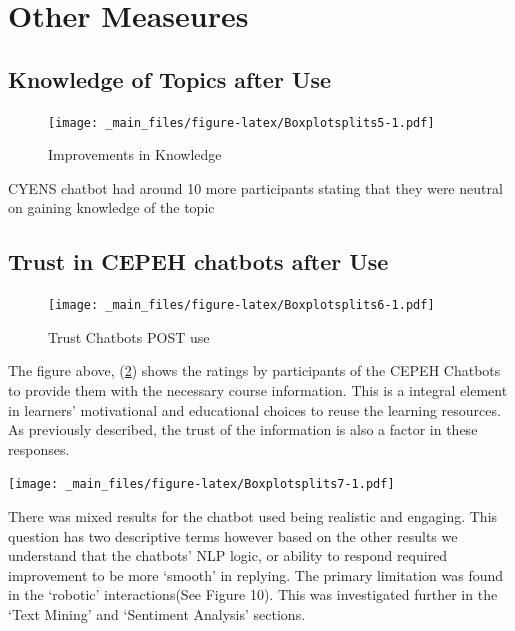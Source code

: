 \documentclass[a4paper, nobind]{templates/ociamthesis}
\begin{document}
\hypertarget{other-measeures}{%
\section{Other Measeures}\label{other-measeures}}

\hypertarget{knowledge-of-topics-after-use}{%
\subsection{Knowledge of Topics after Use}\label{knowledge-of-topics-after-use}}

\begin{figure}
\centering
\texttt{[image: \_main\_files/figure-latex/Boxplotsplits5-1.pdf]}
\caption{\label{fig:Boxplotsplits5}Improvements in Knowledge}
\end{figure}

CYENS chatbot had around 10 more participants stating that they were
neutral on gaining knowledge of the topic

\hypertarget{trust-in-cepeh-chatbots-after-use}{%
\subsection{Trust in CEPEH chatbots after Use}\label{trust-in-cepeh-chatbots-after-use}}

\begin{figure}
\centering
\texttt{[image: \_main\_files/figure-latex/Boxplotsplits6-1.pdf]}
\caption{\label{fig:Boxplotsplits6}Trust Chatbots POST use}
\end{figure}

The figure above, (\ref{fig:Boxplotsplits6}) shows the ratings by
participants of the CEPEH Chatbots to provide them with the necessary
course information. This is a integral element in learners' motivational
and educational choices to reuse the learning resources. As previously
described, the trust of the information is also a factor in these
responses.

\texttt{[image: \_main\_files/figure-latex/Boxplotsplits7-1.pdf]}

There was mixed results for the chatbot used being realistic and
engaging. This question has two descriptive terms however based on the
other results we understand that the chatbots' NLP logic, or ability to
respond required improvement to be more `smooth' in replying. The
primary limitation was found in the `robotic' interactions(See Figure
10). This was investigated further in the `Text Mining' and `Sentiment
Analysis' sections.
\end{document}
